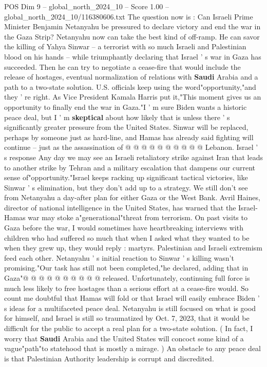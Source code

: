 \begin{textsample}{POS Dim 9 – global\_north\_2024\_10 – Score 1.00 – global\_north\_2024\_10/116380606.txt}  \label{ex:f9_pos_401}
The question now is : Can Israeli Prime Minister Benjamin Netanyahu be pressured to declare victory and end the war in the Gaza Strip?
Netanyahu now can take the best kind of off-ramp.
He can savor the killing of Yahya Sinwar -- a terrorist with so much Israeli and Palestinian blood on his hands -- while triumphantly declaring that Israel ' s war in Gaza has succeeded.
Then he can try to negotiate a cease-fire that would include the release of hostages, eventual normalization of relations with \textbf{Saudi} Arabia and a path to a two-state solution.
U.S. officials keep using the word"opportunity,"and they ' re right.
As Vice President Kamala Harris put it,"This moment gives us an opportunity to finally end the war in Gaza."I ' m sure Biden wants a historic peace deal, but I ' m \textbf{skeptical} about how likely that is unless there ' s significantly greater pressure from the United States.
Sinwar will be replaced, perhaps by someone just as hard-line, and Hamas has already said fighting will continue -- just as the assassination of @ @ @ @ @ @ @ @ @ @ Lebanon.
Israel ' s response Any day we may see an Israeli retaliatory strike against Iran that leads to another strike by Tehran and a military escalation that dampens our current sense of"opportunity."Israel keeps racking up significant tactical victories, like Sinwar ' s elimination, but they don't add up to a strategy.
We still don't see from Netanyahu a day-after plan for either Gaza or the West Bank.
Avril Haines, director of national intelligence in the United States, has warned that the Israel-Hamas war may stoke a"generational"threat from terrorism.
On past visits to Gaza before the war, I would sometimes have heartbreaking interviews with children who had suffered so much that when I asked what they wanted to be when they grew up, they would reply : martyrs.
Palestinian and Israeli extremism feed each other.
Netanyahu ' s initial reaction to Sinwar ' s killing wasn't promising."Our task has still not been completed,"he declared, adding that in Gaza"@ @ @ @ @ @ @ @ @ @ released.
Unfortunately, continuing full force is much less likely to free hostages than a serious effort at a cease-fire would.
So count me doubtful that Hamas will fold or that Israel will easily embrace Biden ' s ideas for a multifaceted peace deal.
Netanyahu is still focused on what is good for himself, and Israel is still so traumatized by Oct. 7, 2023, that it would be difficult for the public to accept a real plan for a two-state solution. ( In fact, I worry that \textbf{Saudi} Arabia and the United States will concoct some kind of a vague"path"to statehood that is mostly a mirage. ) An obstacle to any peace deal is that Palestinian Authority leadership is corrupt and discredited.

\end{textsample}
